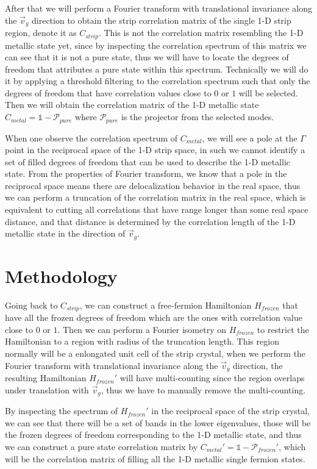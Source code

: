\documentclass[%
    reprint,
    amsmath,amssymb,
    aps,
    floatfix,
]{revtex4-2}
\theoremstyle{plain}
\begin{document}
After that we will perform a Fourier transform with translational invariance along the $\vec{v}_{g}$ direction to obtain the strip correlation 
matrix of the single 1-D strip region, denote it as $C_{strip}$. This is not the correlation matrix resembling the 1-D metallic state yet, since 
by inspecting the correlation spectrum of this matrix we can see that it is not a pure state, thus we will have to locate the degrees of freedom 
that attributes a pure state within this spectrum. Technically we will do it by applying a threshold filtering to the correlation spectrum such 
that only the degrees of freedom that have correlation values close to $0$ or $1$ will be selected. Then we will obtain the correlation matrix of 
the 1-D metallic state $C_{metal} = \mathds{1} - \mathcal{P}_{pure}$ where $\mathcal{P}_{pure}$ is the projector from the selected modes.

When one observe the correlation spectrum of $C_{metal}$, we will see a pole at the $\Gamma$ point in the reciprocal space of the 1-D strip space, 
in such we cannot identify a set of filled degrees of freedom that can be used to describe the 1-D metallic state. From the properties of Fourier 
transform, we know that a pole in the reciprocal space means there are delocalization behavior in the real space, thus we can perform a truncation 
of the correlation matrix in the real space, which is equivalent to cutting all correlations that have range longer than some real space distance, 
and that distance is determined by the correlation length of the 1-D metallic state in the direction of $\vec{v}_{g}$.

\section{Methodology}
Going back to $C_{strip}$, we can construct a free-fermion Hamiltonian $H_{frozen}$ that have all the frozen degrees of freedom which are the ones 
with correlation value close to $0$ or $1$. Then we can perform a Fourier isometry on $H_{frozen}$ to restrict the Hamiltonian to a region with radius 
of the truncation length. This region normally will be a enlongated unit cell of the strip crystal, when we perform the Fourier transform with 
translational invariance along the $\vec{v}_{g}$ direction, the resulting Hamiltonian $H_{frozen}'$ will have multi-counting since the region overlaps 
under translation with $\vec{v}_{g}$, thus we have to manually remove the multi-counting.

By inspecting the spectrum of $H_{frozen}'$ in the reciprocal space of the strip crystal, we can see that there will be a set of bands in the lower 
eigenvalues, those will be the frozen degrees of freedom corresponding to the 1-D metallic state, and thus we can construct a pure state correlation matrix 
by $C_{metal}' = \mathds{1} - \mathcal{P}_{frozen}'$, which will be the correlation matrix of filling all the 1-D metallic single fermion states.
\end{document}
